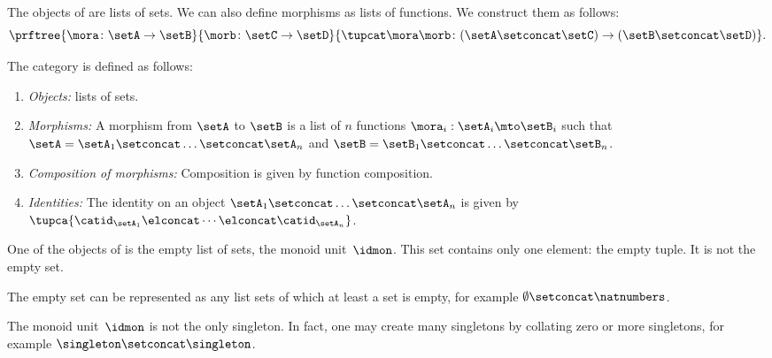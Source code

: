 The objects of \SetStar are lists of sets.
We can also define morphisms as lists of functions.
We construct them as follows:
%
\begin{equation}
    \label{eq:sets-monoid-maps2}
    \prftree{ \mora \colon \setA \to \setB}{ \morb \colon \setC \to \setD}{ \tupcat \mora \morb \colon (\setA \setconcat \setC)\to (\setB \setconcat \setD)}.
\end{equation}
%
\begin{definition}
    The category \SetStar is defined as follows: 
    \begin{enumerate}
        \item \emph{Objects:} lists of sets.
        \item \emph{Morphisms:} A morphism from $\setA$ to $\setB$ is a list of $n$ functions $\mora_i: \setA_i \mto \setB_i$ such that $\setA = \setA_1 \setconcat \dots \setconcat \setA_n$ and  $\setB = \setB_1 \setconcat \dots \setconcat \setB_n$.
        \item \emph{Composition of morphisms:} Composition is given by function composition.
        \item \emph{Identities:} The identity on an object $\setA_1 \setconcat \dots \setconcat \setA_n$ is given by $\tupca{\catid_{\setA_1}\elconcat \cdots \elconcat \catid_{\setA_n}}$.
    \end{enumerate}
\end{definition}
One of the objects of \SetStar is the empty list of sets, the monoid unit~$\idmon$.
This set contains only one element: the empty tuple.
It is not the empty set.

The empty set can be represented as any list sets of which at least a set is empty, for example 
$\emptyset \setconcat \natnumbers$.

The monoid unit~$\idmon$ is not the only singleton. 
In fact, one may create many singletons by collating zero or more singletons,
for example $
    \singleton \setconcat \singleton 
$.




%

\showslides{
    \begin{forslides}
        
        \begin{equation}
            \tupca \ela   = \ela
        \end{equation}
        ~
        \begin{equation}
            \label{eq:sets-monoid-el-cat}
            \tupcat \ela \elb \elconcat \elc = \tupcatt \ela \elb \elc
        \end{equation}
    \end{forslides}
}
